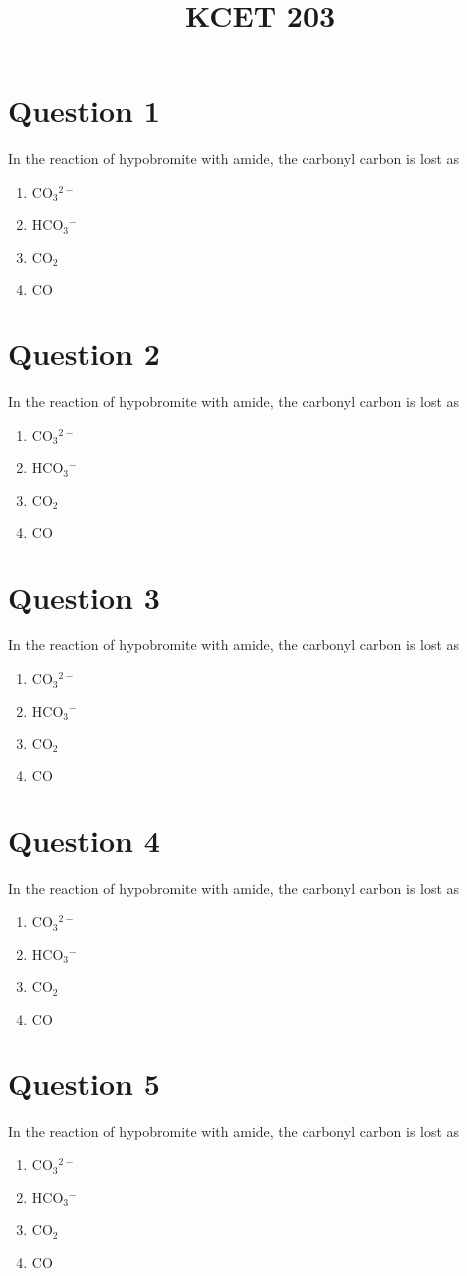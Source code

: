 \documentclass{article}
\title{KCET 203}
\begin{document}
                    \maketitle
                    \section*{Question 1}
In the reaction of hypobromite with amide, the carbonyl carbon is lost as 
\begin{enumerate}[label=(\alph*)]
\item \(\mathrm{CO}_3{ }^{2-}\)
\item \(\mathrm{HCO}_3{ }^{-}\)
\item \(\mathrm{CO}_2\)
\item \(\mathrm{CO}\)
\end{enumerate}
\newpage
\section*{Question 2}
In the reaction of hypobromite with amide, the carbonyl carbon is lost as 
\begin{enumerate}[label=(\alph*)]
\item \(\mathrm{CO}_3{ }^{2-}\)
\item \(\mathrm{HCO}_3{ }^{-}\)
\item \(\mathrm{CO}_2\)
\item \(\mathrm{CO}\)
\end{enumerate}
\newpage
\section*{Question 3}
In the reaction of hypobromite with amide, the carbonyl carbon is lost as 
\begin{enumerate}[label=(\alph*)]
\item \(\mathrm{CO}_3{ }^{2-}\)
\item \(\mathrm{HCO}_3{ }^{-}\)
\item \(\mathrm{CO}_2\)
\item \(\mathrm{CO}\)
\end{enumerate}
\newpage
\section*{Question 4}
In the reaction of hypobromite with amide, the carbonyl carbon is lost as 
\begin{enumerate}[label=(\alph*)]
\item \(\mathrm{CO}_3{ }^{2-}\)
\item \(\mathrm{HCO}_3{ }^{-}\)
\item \(\mathrm{CO}_2\)
\item \(\mathrm{CO}\)
\end{enumerate}
\newpage
\section*{Question 5}
In the reaction of hypobromite with amide, the carbonyl carbon is lost as 
\begin{enumerate}[label=(\alph*)]
\item \(\mathrm{CO}_3{ }^{2-}\)
\item \(\mathrm{HCO}_3{ }^{-}\)
\item \(\mathrm{CO}_2\)
\item \(\mathrm{CO}\)
\end{enumerate}
\newpage
\end{document}
